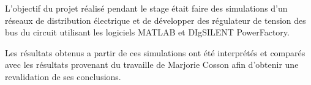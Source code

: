 L'objectif du projet réalisé pendant le stage était faire des simulations d'un réseaux de distribution électrique et de développer des régulateur de tension des bus du circuit utilisant les logiciels MATLAB et DIgSILENT PowerFactory.

Les résultats obtenus a partir de ces simulations ont été interprétés et comparés avec les résultats provenant du travaille de Marjorie Cosson \cite{cosson:tel-01374469} afin d'obtenir une revalidation de ses conclusions.   
\pagebreak


